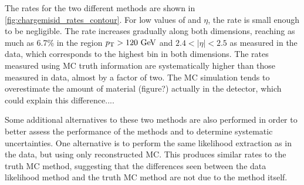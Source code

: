The rates for the two different methods are 
shown in \fig\ref{fig:chargemisid_rates_contour}.
For low values of \pt and $\eta$, the rate is small enough to be negligible. 
The rate increases gradually along both dimensions, reaching as much as
6.7\% in the region $\pt > 120\GeV$ and $2.4 < |\eta| < 2.5$ as measured
in the data, which corresponds to the highest bin in both dimensions. 
The rates measured using MC truth information are systematically higher
than those measured in data, almost by a factor of two. The MC simulation
tends to overestimate the amount of material (figure?) actually in the
detector, which could explain this difference....





Some additional alternatives to these two methods are also performed
in order to better assess the performance of the methods
and to determine systematic uncertainties.
One alternative is to perform the same likelihood extraction
as in the data, but using only reconstructed MC. This produces
similar rates to the truth MC method, suggesting that the differences
seen between the data likelihood method and the truth MC method
are not due to the method itself. 

